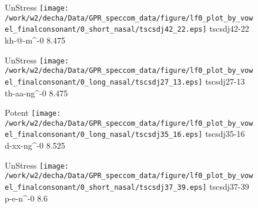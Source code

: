 \documentclass{article}
\begin{document}
\begin{figure}[t]
\begin{minipage}[b]{.24\textwidth}
UnStress
\centering
\texttt{[image: /work/w2/decha/Data/GPR\_speccom\_data/figure/lf0\_plot\_by\_vowel\_finalconsonant/0\_short\_nasal/tscsdj42\_22.eps]}
tscsdj42-22 kh-@-m\textasciicircum-0 8.475
\end{minipage}
\begin{minipage}[b]{.24\textwidth}
UnStress
\centering
\texttt{[image: /work/w2/decha/Data/GPR\_speccom\_data/figure/lf0\_plot\_by\_vowel\_finalconsonant/0\_long\_nasal/tscsdj27\_13.eps]}
tscsdj27-13 th-aa-ng\textasciicircum-0 8.475
\end{minipage}
\begin{minipage}[b]{.24\textwidth}
\colorbox{Apricot}{Potent}
\centering
\texttt{[image: /work/w2/decha/Data/GPR\_speccom\_data/figure/lf0\_plot\_by\_vowel\_finalconsonant/0\_long\_nasal/tscsdj35\_16.eps]}
tscsdj35-16 d-xx-ng\textasciicircum-0 8.525
\end{minipage}
\begin{minipage}[b]{.24\textwidth}
UnStress
\centering
\texttt{[image: /work/w2/decha/Data/GPR\_speccom\_data/figure/lf0\_plot\_by\_vowel\_finalconsonant/0\_short\_nasal/tscsdj37\_39.eps]}
tscsdj37-39 p-e-n\textasciicircum-0 8.6
\end{minipage}
\end{figure}
\end{document}
